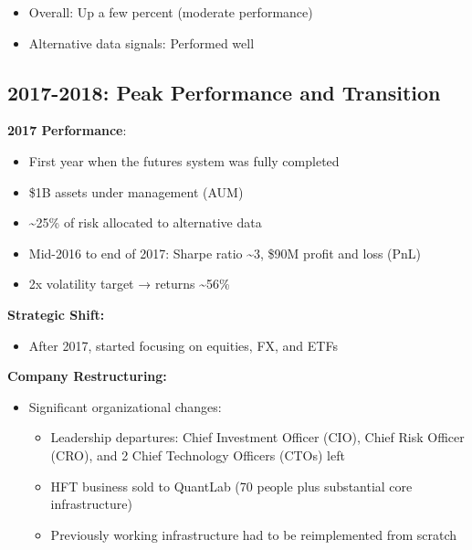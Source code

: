 \documentclass[11pt, letterpaper]{article}
\providecommand{\tightlist}{%
\setlength{\itemsep}{0pt}
\setlength{\parskip}{0pt}}
\begin{document}
  \begin{itemize}
    \item Overall: Up a few percent (moderate performance)

    \item Alternative data signals: Performed well
  \end{itemize}

  \subsection{2017-2018: Peak Performance and Transition}
  \label{peak-performance-and-transition}

  \textbf{2017 Performance}:

  \begin{itemize}
    \item First year when the futures system was fully completed

    \item \$1B assets under management (AUM)

    \item \textasciitilde25\% of risk allocated to alternative data

    \item Mid-2016 to end of 2017: Sharpe ratio \textasciitilde3, \$90M profit
      and loss (PnL)

    \item 2x volatility target → returns \textasciitilde56\%
  \end{itemize}

  \textbf{Strategic Shift:}

  \begin{itemize}
    \tightlist

    \item After 2017, started focusing on equities, FX, and ETFs
  \end{itemize}

  \textbf{Company Restructuring:}

  \begin{itemize}
    \item Significant organizational changes:

      \begin{itemize}
        \item Leadership departures: Chief Investment Officer (CIO), Chief
          Risk Officer (CRO), and 2 Chief Technology Officers (CTOs)
          left

        \item HFT business sold to QuantLab (70 people plus substantial
          core infrastructure)

        \item Previously working infrastructure had to be reimplemented from
          scratch
      \end{itemize}
  \end{itemize}
\end{document}

